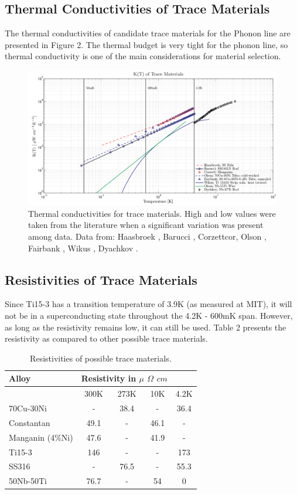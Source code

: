 \documentclass{report}
\begin{document}
\subsection{Thermal Conductivities of Trace Materials}

The thermal conductivities of candidate trace materials for the Phonon line are presented in Figure 2. The thermal budget is very tight for the phonon line, so thermal conductivity is one of the main considerations for material selection.

\begin{figure}[h]
\centering
\includegraphics[width = .8\textwidth]{Trace_material_k.png}
\caption{Thermal conductivities for trace materials. High and low values were taken from the literature when a significant variation was present among data. Data from: Haasbroek \cite{has}, Barucci \cite{Barucci2008}, Corzett{cor}, Olson \cite{ols}, Fairbank \cite{fair}, Wikus \cite{wik}, Dyachkov \cite{dya}.}
\end{figure}


\subsection{Resistivities of Trace Materials}
Since Ti15-3 has a transition temperature of 3.9K (as measured at MIT), it will not be in a superconducting state throughout the 4.2K - 600mK span. However, as long as the resistivity remains low, it can still be used. Table 2 presents the resistivity as compared to other possible trace materials.

\begin{table}[h]
\centering
\begin{threeparttable}
\begin{tabular}{l|c|c|c|c}
Alloy & \multicolumn{3}{c}{Resistivity in $\mu$ $\Omega$ $cm$} \\\toprule
 & 300K & 273K & 10K & 4.2K \\\midrule
70Cu-30Ni & - & 38.4 & - & 36.4 \\
Constantan & 49.1 & - & 46.1 & - \\
Manganin (4\%Ni) & 47.6 & - & 41.9 & - \\
Ti15-3 & 146 & - & - & 173 \\
SS316 & - & 76.5 & - & 55.3 \\
50Nb-50Ti & 76.7 & - & 54 & 0 \\
\end{tabular}
\end{threeparttable}
\caption{Resistivities of possible trace materials.}
\end{table}
\end{document}
